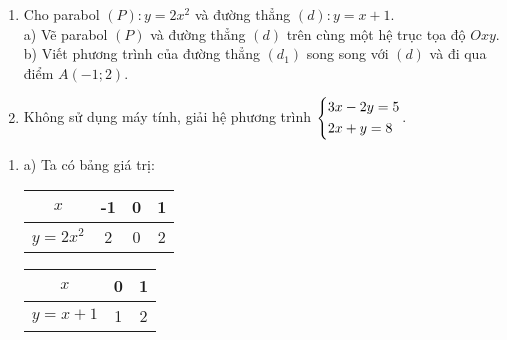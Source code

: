 \begin{ex}%
    \hfill
    \begin{enumerate}
        \item Cho parabol $(P):y=2x^2$ và đường thẳng $(d):y=x+1$.\\
        a) Vẽ parabol $(P)$ và đường thẳng $(d)$ trên cùng một hệ trục tọa độ $Oxy$.\\
		b) Viết phương trình của đường thẳng $(d_1)$ song song với $(d)$ và đi qua điểm $A(-1;2)$.
        \item Không sử dụng máy tính, giải hệ phương trình $\left\{\begin{aligned}&3x-2y=5\\&2x+y=8\end{aligned}\right.$.
    \end{enumerate}
\loigiai
    {
    \begin{enumerate}
        \item a) Ta có bảng giá trị:\\
       \begin{minipage}[h]{0.5\textwidth}
       	\begin{tabular}{c|c|c|c}
       		
       		$x$     &-1  & 0 & 1   \\ 
       		\hline 
       		$y=2x^2$&2& 0 & 2   \\ 
       		
       	\end{tabular} 
       	\vspace*{1cm}
       	
       	\begin{tabular}{c|c|c}
       		
       		$x$	    &0 &1  \\ 
       		\hline 
       		$y=x+1$&1 &2  \\ 
       		
       	\end{tabular} 
       	

\end{minipage}
\end{enumerate}}
\end{ex}
